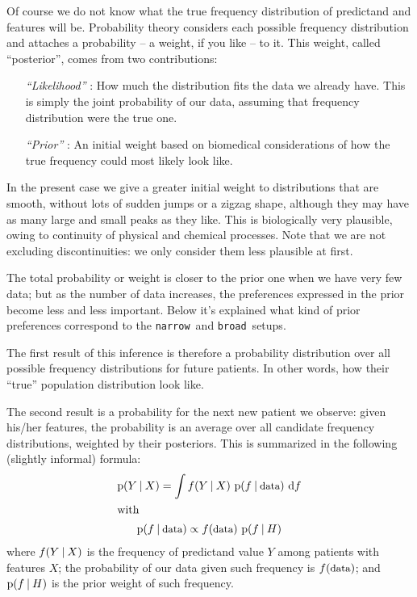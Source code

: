 \documentclass[\ifafour a4paper,12pt,\else a5paper,10pt,\fi%
onecolumn,oneside,article,%
british%
]{memoir}
\theoremstyle{remark}
\theoremstyle{innote}
\newcommand*{\di}{\mathrm{d}}%
\newcommand*{\p}{\mathrm{p}}%
\renewcommand*{\|}[1][]{\nonscript\:#1\vert\nonscript\:\mathopen{}}
\newcommand*{\narrow}{\texttt{narrow}}
\newcommand*{\broad}{\texttt{broad}}
\begin{document}
Of course we do not know what the true frequency distribution of predictand
and features will be. Probability theory considers each possible frequency
distribution and attaches a probability -- a weight, if you like -- to it.
This weight, called \enquote{posterior}, comes from two contributions:
\begin{itemize}[wide]
\item[\emph{\enquote{Likelihood}}]\!: How much the distribution fits the data
  we already have. This is simply the joint probability of our data,
  assuming that frequency distribution were the true one.
\item[\emph{\enquote{Prior}}]\!: An initial weight based on biomedical
  considerations of how the true frequency could most likely look like.
\end{itemize}
In the present case we give a greater initial weight to distributions that
are smooth, without lots of sudden jumps or a zigzag shape, although they
may have as many large and small peaks as they like. This is biologically
very plausible, owing to continuity of physical and chemical processes.
Note that we are not excluding discontinuities: we only consider them less
plausible at first.

The total probability or weight is closer to the prior one when we have
very few data; but as the number of data increases, the preferences
expressed in the prior become less and less important. Below it's explained
what kind of prior preferences correspond to the \narrow\ and \broad\
setups.

The first result of this inference is therefore a probability distribution
over all possible frequency distributions for future patients. In other
words, how their \enquote{true} population distribution look like.

The second result is a probability for the next new patient we observe:
given his/her features, the probability is an average over all candidate
frequency distributions, weighted by their posteriors. This is summarized
in the following (slightly informal) formula:
\begin{subequations}  \label{eq:definetti}
  \begin{gather}
    \p(Y \|X) =    \int f(Y \| X) \ \p(f \| \textrm{\small data})\ \di f
    \\
    \shortintertext{with}
    \p(f \| \textrm{\small data}) \propto
    f(\textrm{\small data})\ \p(f \| H)
  \end{gather}
\end{subequations}
where $f(Y\|X)$ is the frequency of predictand value $Y$ among patients
with features $X$; the probability of our data given such frequency is
$f(\textrm{\small data})$; and $\p(f \| H)$ is the prior weight of such
frequency.
\end{document}
